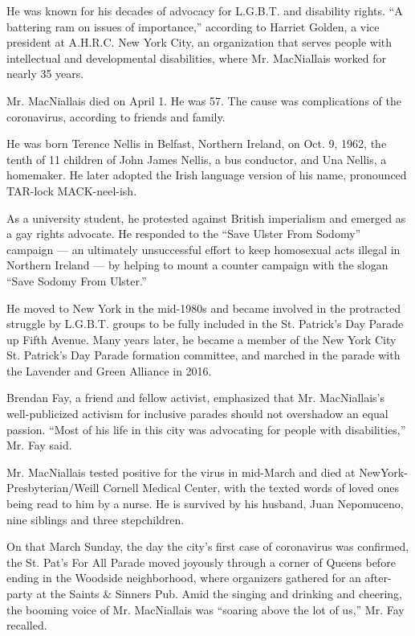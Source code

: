 He was known for his decades of advocacy for L.G.B.T. and disability
rights. ``A battering ram on issues of importance,'' according to
Harriet Golden, a vice president at A.H.R.C. New York City, an
organization that serves people with intellectual and developmental
disabilities, where Mr. MacNiallais worked for nearly 35 years.

Mr. MacNiallais died on April 1. He was 57. The cause was complications
of the coronavirus, according to friends and family.

He was born Terence Nellis in Belfast, Northern Ireland, on Oct. 9,
1962, the tenth of 11 children of John James Nellis, a bus conductor,
and Una Nellis, a homemaker. He later adopted the Irish language version
of his name, pronounced TAR-lock MACK-neel-ish.

As a university student, he protested against British imperialism and
emerged as a gay rights advocate. He responded to the ``Save Ulster From
Sodomy'' campaign --- an ultimately unsuccessful effort to keep
homosexual acts illegal in Northern Ireland --- by helping to mount a
counter campaign with the slogan ``Save Sodomy From Ulster.''

He moved to New York in the mid-1980s and became involved in the
protracted struggle by L.G.B.T. groups to be fully included in the St.
Patrick's Day Parade up Fifth Avenue. Many years later, he became a
member of the New York City St. Patrick's Day Parade formation
committee, and marched in the parade with the Lavender and Green
Alliance in 2016.

Brendan Fay, a friend and fellow activist, emphasized that Mr.
MacNiallais's well-publicized activism for inclusive parades should not
overshadow an equal passion. ``Most of his life in this city was
advocating for people with disabilities,'' Mr. Fay said.

Mr. MacNiallais tested positive for the virus in mid-March and died at
NewYork-Presbyterian/Weill Cornell Medical Center, with the texted words
of loved ones being read to him by a nurse. He is survived by his
husband, Juan Nepomuceno, nine siblings and three stepchildren.

On that March Sunday, the day the city's first case of coronavirus was
confirmed, the St. Pat's For All Parade moved joyously through a corner
of Queens before ending in the Woodside neighborhood, where organizers
gathered for an after-party at the Saints \& Sinners Pub. Amid the
singing and drinking and cheering, the booming voice of Mr. MacNiallais
was ``soaring above the lot of us,'' Mr. Fay recalled.

